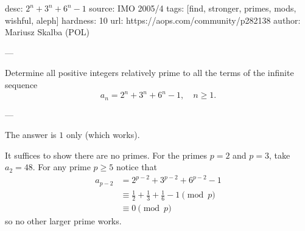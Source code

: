 desc:  $2^n+3^n+6^n-1$
source:  IMO 2005/4
tags:  [find, stronger, primes, mods, wishful, aleph]
hardness: 10
url: https://aops.com/community/p282138
author: Mariusz Skalba (POL)

---

Determine all positive integers relatively
prime to all the terms of the infinite sequence
\[ a_n = 2^n+3^n+6^n-1, \quad n \ge 1. \]

---

The answer is $1$ only (which works).

It suffices to show there are no primes.
For the primes $p=2$ and $p=3$, take $a_2=48$.
For any prime $p \ge 5$ notice that
\begin{align*}
  a_{p-2} &= 2^{p-2} + 3^{p-2} + 6^{p-2} - 1 \\
  &\equiv \frac 12 + \frac 13 + \frac 16 - 1 \pmod p \\
  &\equiv 0 \pmod p
\end{align*}
so no other larger prime works.
